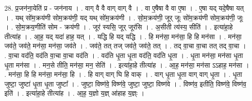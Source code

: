 \documentclass[17pt]{extarticle}
\begin{document}
28. प्र॒जन॑ना॒येति॑ प्र - जन॑नाय । . वाग् वै वै वाग् वाग् वै । . वा ए॒षैषा वै वा ए॒षा । . ए॒षा यद् यदे॒षैषा यत् । . यथ् सो॑म॒क्रय॑णी सोम॒क्रय॑णी॒ यद् यथ् सो॑म॒क्रय॑णी । . सो॒म॒क्रय॑णी॒ जूर् जूः सो॑म॒क्रय॑णी सोम॒क्रय॑णी॒ जूः । . सो॒म॒क्रय॒णीति॑ सोम - क्रय॑णी । . जूर॑ स्यसि॒ जूर् जूर॑सि । . अ॒सीती त्य॑स्य॒ सीति॑ । . इत्या॑हा॒हे तीत्या॑ह । . आ॒ह॒ यद् यदा॑ हाह॒ यत् । . यद्धि हि यद् यद्धि । . हि मन॑सा॒ मन॑सा॒ हि हि मन॑सा । . मन॑सा॒ जव॑ते॒ जव॑ते॒ मन॑सा॒ मन॑सा॒ जव॑ते । . जव॑ते॒ तत् तज् जव॑ते॒ जव॑ते॒ तत् । . तद् वा॒चा वा॒चा तत् तद् वा॒चा । . वा॒चा वद॑ति॒ वद॑ति वा॒चा वा॒चा वद॑ति । . वद॑ति धृ॒ता धृ॒ता वद॑ति॒ वद॑ति धृ॒ता । . धृ॒ता मन॑सा॒ मन॑सा धृ॒ता धृ॒ता मन॑सा । . मन॒से तीति॒ मन॑सा॒ मन॒ सेति॑ । . इत्या॑हा॒हे तीत्या॑ह । . आ॒ह॒ मन॑सा॒ मन॑सा ऽऽहाह॒ मन॑सा । . मन॑सा॒ हि हि मन॑सा॒ मन॑सा॒ हि । . हि वाग् वाग् घि हि वाक् । . वाग् धृ॒ता धृ॒ता वाग् वाग् धृ॒ता । . धृ॒ता जुष्टा॒ जुष्टा॑ धृ॒ता धृ॒ता जुष्टा᳚ । . जुष्टा॒ विष्ण॑वे॒ विष्ण॑वे॒ जुष्टा॒ जुष्टा॒ विष्ण॑वे । . विष्ण॑व॒ इतीति॒ विष्ण॑वे॒ विष्ण॑व॒ इति॑ । . इत्या॑हा॒हे तीत्या॑ह । . आ॒ह॒ य॒ज्ञो य॒ज्ञ् आ॑हाह य॒ज्ञ्ः । \newline
\end{document}
